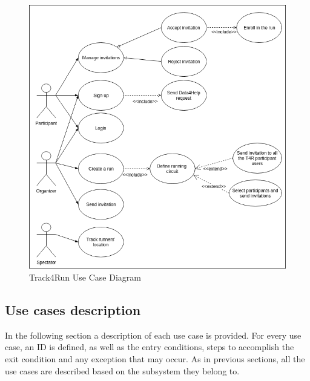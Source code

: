 \documentclass[hidelinks, 12pt]{report}
\begin{document}
\begin{itemize}
		\begin{figure}[H]
			\centering
			\includegraphics[scale=0.6]{Diagrams/t4r_use_cases.png}
			\caption[Track4Run Use Case Diagram]{Track4Run Use Case Diagram}
			\label{fig:t4r_use_cases}
		\end{figure}
	\end{itemize}
	
	\subsection{Use cases description}
	In the following section a description of each use case is provided. For every use case, an ID is defined, as well as the entry conditions, steps to accomplish the exit condition and any exception that may occur. As in previous sections, all the use cases are described based on the subsystem they belong to.
	
\end{document}
